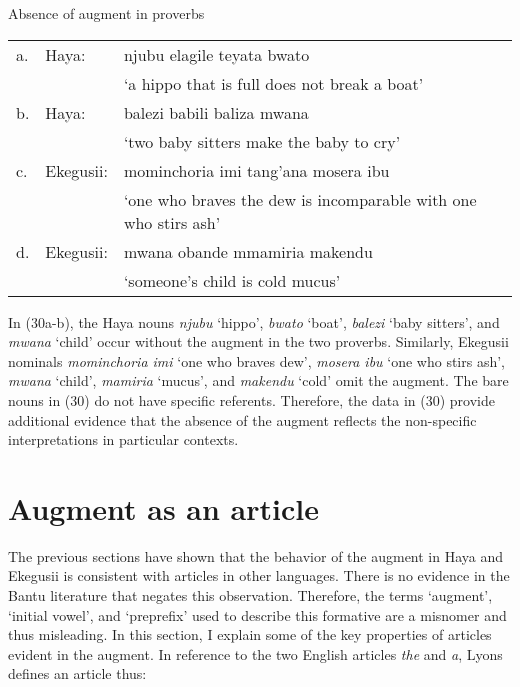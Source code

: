 \documentclass[output=paper]{langscibook}
\begin{document}
\begin{exe}
\ex Absence of augment in proverbs\\
\label{hayagusii30}
\begin{tabular}{p{0.5cm} p{2cm} p{8cm}}
 a.	& Haya:	&	njubu elagile teyata bwato \\
& &‘a hippo that is full does not break a boat’\\
b. &	Haya:	&	balezi babili baliza mwana \\
& &‘two baby sitters make the baby to cry’\\
c. &	Ekegusii: &	mominchoria imi tang’ana mosera ibu \\
& & ‘one who braves the dew is incomparable with one who stirs ash’\\
d. &	Ekegusii: &	mwana obande mmamiria makendu\\
& &‘someone’s child is cold mucus’\\

\end{tabular}
\end{exe}
In (30a-b), the Haya nouns \textit{njubu} ‘hippo’, \textit{bwato} ‘boat’, \textit{balezi} ‘baby sitters’, and \textit{mwana} ‘child’ occur without the augment in the two proverbs. Similarly, Ekegusii nominals \textit{mominchoria imi} ‘one who braves dew’, \textit{mosera ibu} ‘one who stirs ash’, \textit{mwana} ‘child’, \textit{mamiria} ‘mucus’, and \textit{makendu} ‘cold’ omit the augment. The bare nouns in (30) do not have specific referents. Therefore, the data in (30) provide additional evidence that the absence of the augment reflects the non-specific interpretations in particular contexts.

\section{Augment as an article}\label{sec:choti:6}
The previous sections have shown that the behavior of the augment in Haya and Ekegusii is consistent with articles in other languages. There is no evidence in the Bantu literature that negates this observation. Therefore, the terms ‘augment’, ‘initial vowel’, and ‘preprefix’ used to describe this formative are a misnomer and thus misleading. In this section, I explain some of the key properties of articles evident in the augment. In reference to the two English articles \textit{the} and \textit{a}, Lyons \citet[36]{lyons1999definiteness}  defines an article thus:
\end{document}

